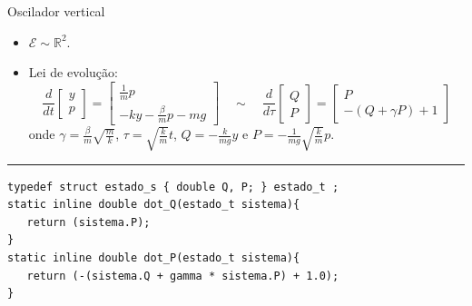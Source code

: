 \documentclass{beamer}
\begin{document}
\begin{frame}[fragile]{Oscilador vertical}

   \begin{itemize}
      \item $\mathcal E \sim \mathbb R^2$.
      \item Lei de evolução:
      \begin{equation}
         \frac{d}{dt}
         \begin{bmatrix} y \\ p \end{bmatrix} =
         \begin{bmatrix}
            \frac{1}{m} p \\
            -k y - \frac{\beta}{m} p  - m g
         \end{bmatrix}
         \quad\sim\quad
         \frac{d}{d\tau}
         \begin{bmatrix} Q \\ P \end{bmatrix} =
         \begin{bmatrix} P \\ -(Q + \gamma P) + 1 \end{bmatrix}
      \end{equation}
      onde $\gamma = \frac{\beta}{m}\sqrt{\frac{m}{k}}$,
      $\tau = \sqrt{\frac{k}{m}} t$,
      $Q = - \frac{k}{mg} y$ e
      $P = - \frac{1}{mg} \sqrt{\frac{k}{m}} p$.
   \end{itemize}

   \rule{\textwidth}{1pt}
   \scriptsize
\begin{lstlisting}[style = c]
typedef struct estado_s { double Q, P; } estado_t ;
static inline double dot_Q(estado_t sistema){
   return (sistema.P);
}
static inline double dot_P(estado_t sistema){
   return (-(sistema.Q + gamma * sistema.P) + 1.0);
}
\end{lstlisting}
\end{frame}
\end{document}
